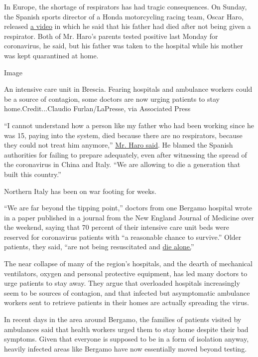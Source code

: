 In Europe, the shortage of respirators has had tragic consequences. On
Sunday, the Spanish sports director of a Honda motorcycling racing team,
Oscar Haro, released
\href{https://www.youtube.com/watch?time_continue=101\&v=xDN--tZ7Aho\&feature=emb_logo}{a
video} in which he said that his father had died after not being given a
respirator. Both of Mr. Haro's parents tested positive last Monday for
coronavirus, he said, but his father was taken to the hospital while his
mother was kept quarantined at home.

Image

An intensive care unit in Brescia. Fearing hospitals and ambulance
workers could be a source of contagion, some doctors are now urging
patients to stay home.Credit...Claudio Furlan/LaPresse, via Associated
Press

``I cannot understand how a person like my father who had been working
since he was 15, paying into the system, died because there are no
respirators, because they could not treat him anymore,''
\href{https://www.lavanguardia.com/deportes/20200322/4840170014/oscar-haro-padre-fallecido-coronavirus-respiradores-lcr-honda-motogp.html}{Mr.
Haro said}. He blamed the Spanish authorities for failing to prepare
adequately, even after witnessing the spread of the coronavirus in China
and Italy. ``We are allowing to die a generation that built this
country.''

Northern Italy has been on war footing for weeks.

``We are far beyond the tipping point,'' doctors from one Bergamo
hospital wrote in a paper published in a journal from the New England
Journal of Medicine over the weekend, saying that 70 percent of their
intensive care unit beds were reserved for coronavirus patients with ``a
reasonable chance to survive.'' Older patients, they said, ``are not
being resuscitated and
\href{https://www.nytimes3xbfgragh.onion/2020/03/16/world/europe/italy-coronavirus-funerals.html?action=click\&module=RelatedLinks\&pgtype=Article}{die
alone.}''

The near collapse of many of the region's hospitals, and the dearth of
mechanical ventilators, oxygen and personal protective equipment, has
led many doctors to urge patients to stay away. They argue that
overloaded hospitals increasingly seem to be sources of contagion, and
that infected but asymptomatic ambulance workers sent to retrieve
patients in their homes are actually spreading the virus.

In recent days in the area around Bergamo, the families of patients
visited by ambulances said that health workers urged them to stay home
despite their bad symptoms. Given that everyone is supposed to be in a
form of isolation anyway, heavily infected areas like Bergamo have now
essentially moved beyond testing.

